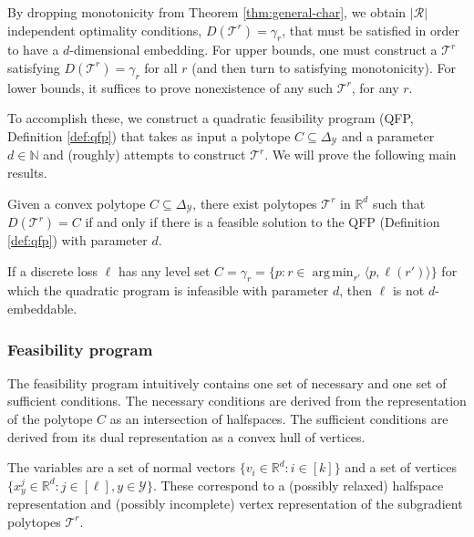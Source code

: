 \documentclass[anon]{colt2020} %
\newcommand{\reals}{\mathbb{R}}
\newcommand{\simplex}{\Delta_\Y}
\newcommand{\R}{\mathcal{R}}
\newcommand{\T}{\mathcal{T}}
\newcommand{\Y}{\mathcal{Y}}
\newcommand{\inprod}[2]{\langle #1, #2 \rangle}%
\DeclareMathOperator*{\argmin}{arg\,min}
\begin{document}
By dropping monotonicity from Theorem \ref{thm:general-char}, we obtain $|\R|$ independent optimality conditions, $D(\T^r) = \gamma_r$, that must be satisfied in order to have a $d$-dimensional embedding.
For upper bounds, one must construct a $\T^r$ satisfying $D(\T^r) = \gamma_r$ for all $r$ (and then turn to satisfying monotonicity).
For lower bounds, it suffices to prove nonexistence of any such $\T^r$, for any $r$.

To accomplish these, we construct a quadratic feasibility program (QFP, Definition \ref{def:qfp}) that takes as input a polytope $C \subseteq \simplex$ and a parameter $d \in \mathbb{N}$ and (roughly) attempts to construct $\T^r$.
We will prove the following main results.
\begin{theorem} \label{thm:opt-iff-qfp}
  Given a convex polytope $C \subseteq \simplex$, there exist polytopes $\T^r$ in $\reals^d$ such that $D(\T^r) = C$ if and only if there is a feasible solution to the QFP (Definition \ref{def:qfp}) with parameter $d$.
\end{theorem}

\begin{corollary}\label{cor:d-embeddable-char}
  If a discrete loss $\ell$ has any level set $C = \gamma_r = \{p : r \in \argmin_{r'} \inprod{p}{\ell(r')} \}$ for which the quadratic program is infeasible with parameter $d$, then $\ell$ is not $d$-embeddable.
\end{corollary}


\subsubsection{Feasibility program}

The feasibility program intuitively contains one set of necessary and one set of sufficient conditions.
The necessary conditions are derived from the representation of the polytope $C$ as an intersection of halfspaces.
The sufficient conditions are derived from its dual representation as a convex hull of vertices.

The variables are a set of normal vectors $\{v_i \in \reals^d : i \in [k]\}$ and a set of vertices $\{x^j_y \in \reals^d : j \in [\ell], y \in \Y\}$.
These correspond to a (possibly relaxed) halfspace representation and (possibly incomplete) vertex representation of the subgradient polytopes $\T^r$.
\end{document}
